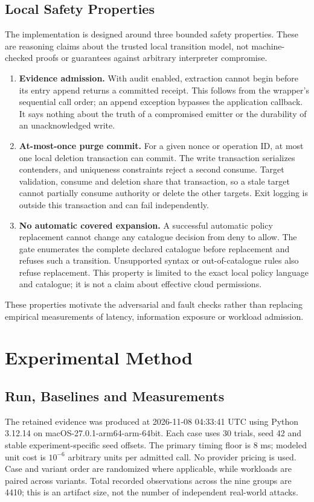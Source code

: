 \documentclass[11pt,a4paper]{article}
\newcommand{\TrialCount}{30}
\newcommand{\SeedValue}{42}
\newcommand{\RunUTC}{2026-11-08 04:33:41 UTC}
\newcommand{\RunPython}{3.12.14}
\newcommand{\RunPlatform}{macOS-27.0.1-arm64-arm-64bit}
\newcommand{\ObservationCount}{4410}
\begin{document}
\subsection{Local Safety Properties}
The implementation is designed around three bounded safety properties. These are reasoning claims about the trusted local transition model, not machine-checked proofs or guarantees against arbitrary interpreter compromise.
\begin{enumerate}
\item \textbf{Evidence admission.} With audit enabled, extraction cannot begin before its entry append returns a committed receipt. This follows from the wrapper's sequential call order; an append exception bypasses the application callback. It says nothing about the truth of a compromised emitter or the durability of an unacknowledged write.
\item \textbf{At-most-once purge commit.} For a given nonce or operation ID, at most one local deletion transaction can commit. The write transaction serializes contenders, and uniqueness constraints reject a second consume. Target validation, consume and deletion share that transaction, so a stale target cannot partially consume authority or delete the other targets. Exit logging is outside this transaction and can fail independently.
\item \textbf{No automatic covered expansion.} A successful automatic policy replacement cannot change any catalogue decision from deny to allow. The gate enumerates the complete declared catalogue before replacement and refuses such a transition. Unsupported syntax or out-of-catalogue rules also refuse replacement. This property is limited to the exact local policy language and catalogue; it is not a claim about effective cloud permissions.
\end{enumerate}
These properties motivate the adversarial and fault checks rather than replacing empirical measurements of latency, information exposure or workload admission.

\section{Experimental Method}\label{sec:method}
\subsection{Run, Baselines and Measurements}
The retained evidence was produced at \RunUTC{} using Python \RunPython{} on \RunPlatform{}. Each case uses \TrialCount{} trials, seed \SeedValue{} and stable experiment-specific seed offsets. The primary timing floor is 8 ms; modeled unit cost is $10^{-6}$ arbitrary units per admitted call. No provider pricing is used. Case and variant order are randomized where applicable, while workloads are paired across variants. Total recorded observations across the nine groups are \ObservationCount{}; this is an artifact size, not the number of independent real-world attacks.
\end{document}

